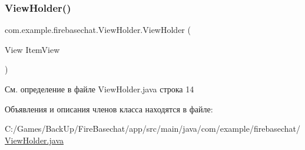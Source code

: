 \subsubsection{\texorpdfstring{View\+Holder()}{ViewHolder()}}
{\footnotesize\ttfamily com.\+example.\+firebasechat.\+View\+Holder.\+View\+Holder (\begin{DoxyParamCaption}\item[{View}]{Item\+View }\end{DoxyParamCaption})}



См. определение в файле View\+Holder.\+java строка 14



Объявления и описания членов класса находятся в файле\+:\begin{DoxyCompactItemize}
\item 
C\+:/\+Games/\+Back\+Up/\+Fire\+Basechat/app/src/main/java/com/example/firebasechat/\mbox{\hyperlink{_view_holder_8java}{View\+Holder.\+java}}\end{DoxyCompactItemize}
